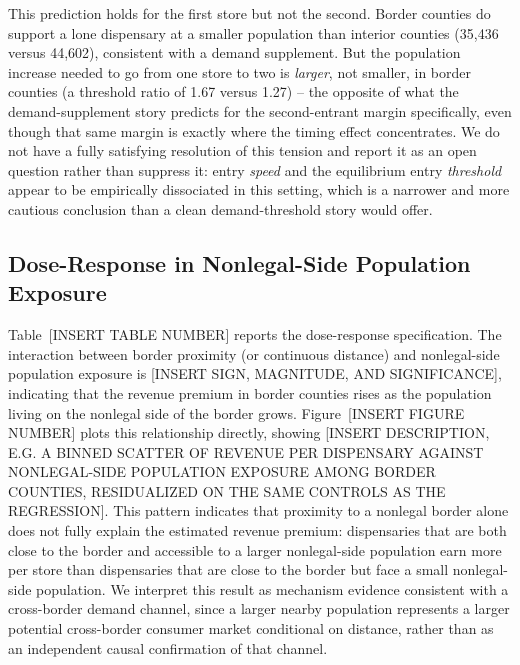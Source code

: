 \documentclass[12pt]{article}
\begin{document}
This prediction holds for the first store but not the second. Border counties do support a lone dispensary
at a smaller population than interior counties (35,436 versus 44,602), consistent with a demand supplement.
But the population increase needed to go from one store to two is \emph{larger}, not smaller, in border
counties (a threshold ratio of 1.67 versus 1.27) -- the opposite of what the demand-supplement story predicts
for the second-entrant margin specifically, even though that same margin is exactly where the timing effect
concentrates. We do not have a fully satisfying resolution of this tension and report it as an open question
rather than suppress it: entry \emph{speed} and the equilibrium entry \emph{threshold} appear to be
empirically dissociated in this setting, which is a narrower and more cautious conclusion than a clean
demand-threshold story would offer.

\subsection{Dose-Response in Nonlegal-Side Population Exposure}
Table~[INSERT TABLE NUMBER] reports the dose-response specification. The interaction between border
proximity (or continuous distance) and nonlegal-side population exposure is [INSERT SIGN, MAGNITUDE, AND
SIGNIFICANCE], indicating that the revenue premium in border counties rises as the population living on the
nonlegal side of the border grows. Figure~[INSERT FIGURE NUMBER] plots this relationship directly, showing
[INSERT DESCRIPTION, E.G. A BINNED SCATTER OF REVENUE PER DISPENSARY AGAINST NONLEGAL-SIDE POPULATION
EXPOSURE AMONG BORDER COUNTIES, RESIDUALIZED ON THE SAME CONTROLS AS THE REGRESSION]. This pattern indicates
that proximity to a nonlegal border alone does not fully explain the estimated revenue premium: dispensaries
that are both close to the border and accessible to a larger nonlegal-side population earn more per store
than dispensaries that are close to the border but face a small nonlegal-side population. We interpret this
result as mechanism evidence consistent with a cross-border demand channel, since a larger nearby
population represents a larger potential cross-border consumer market conditional on distance, rather than
as an independent causal confirmation of that channel.
\end{document}
